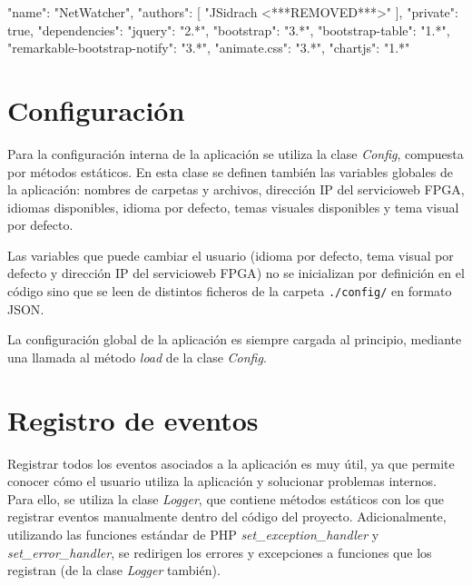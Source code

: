 \begin{code}[label=code:bowerjson,language=json,caption=Ejemplo de fichero \textit{bower.json}]
{
  "name": "NetWatcher",
  "authors": [
    "JSidrach <***REMOVED***>"
  ],
  "private": true,
  "dependencies": {
    "jquery": "2.*",
    "bootstrap": "3.*",
    "bootstrap-table": "1.*",
    "remarkable-bootstrap-notify": "3.*",
    "animate.css": "3.*",
    "chartjs": "1.*"
  }
}
\end{code}

\section{Configuración\label{extra:mvc:config}}

Para la configuración interna de la aplicación se utiliza la clase \textit{Config}, compuesta por métodos estáticos. En esta clase se definen también las variables globales de la aplicación: nombres de carpetas y archivos, dirección IP del \gls{servicioweb} \gls{FPGA}, idiomas disponibles, idioma por defecto, temas visuales disponibles y tema visual por defecto.

Las variables que puede cambiar el usuario (idioma por defecto, tema visual por defecto y dirección IP del \gls{servicioweb} \gls{FPGA}) no se inicializan por definición en el código sino que se leen de distintos ficheros de la carpeta \texttt{./config/} en formato \gls{JSON}.

La configuración global de la aplicación es siempre cargada al principio, mediante una llamada al método \textit{load} de la clase \textit{Config}.

\section{Registro de eventos\label{extra:mvc:logger}}

Registrar todos los eventos asociados a la aplicación es muy útil, ya que permite conocer cómo el usuario utiliza la aplicación y solucionar problemas internos. Para ello, se utiliza la clase \textit{Logger}, que contiene métodos estáticos con los que registrar eventos manualmente dentro del código del proyecto. Adicionalmente, utilizando las funciones estándar de \gls{PHP} \textit{set\_exception\_handler} y \textit{set\_error\_handler}, se redirigen los errores y excepciones a funciones que los registran (de la clase \textit{Logger} también).


